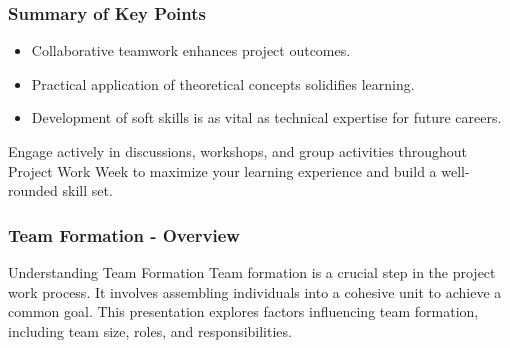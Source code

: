 \documentclass{beamer}
\begin{document}
\begin{frame}[fragile]
    \frametitle{Summary of Key Points}
    \begin{itemize}
        \item Collaborative teamwork enhances project outcomes.
        \item Practical application of theoretical concepts solidifies learning.
        \item Development of soft skills is as vital as technical expertise for future careers.
    \end{itemize}
    Engage actively in discussions, workshops, and group activities throughout Project Work Week to maximize your 
    learning experience and build a well-rounded skill set.
\end{frame}

\begin{frame}[fragile]
    \frametitle{Team Formation - Overview}
    \begin{block}{Understanding Team Formation}
    Team formation is a crucial step in the project work process. It involves assembling individuals into a cohesive unit to achieve a common goal. This presentation explores factors influencing team formation, including team size, roles, and responsibilities.
    \end{block}
\end{frame}
\end{document}
